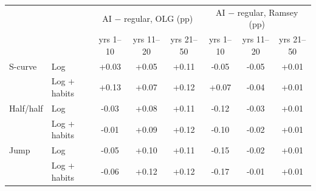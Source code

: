\begin{tabular}{llcccccc}\toprule
 & & \multicolumn{3}{c}{AI $-$ regular, OLG (pp)} & \multicolumn{3}{c}{AI $-$ regular, Ramsey (pp)}\\
 & & yrs 1--10 & yrs 11--20 & yrs 21--50 & yrs 1--10 & yrs 11--20 & yrs 21--50\\\midrule
S-curve & Log & +0.03 & +0.05 & +0.11 & -0.05 & -0.05 & +0.01\\
 & Log + habits & +0.13 & +0.07 & +0.12 & +0.07 & -0.04 & +0.01\\
\midrule
Half/half & Log & -0.03 & +0.08 & +0.11 & -0.12 & -0.03 & +0.01\\
 & Log + habits & -0.01 & +0.09 & +0.12 & -0.10 & -0.02 & +0.01\\
\midrule
Jump & Log & -0.05 & +0.10 & +0.11 & -0.15 & -0.02 & +0.01\\
 & Log + habits & -0.06 & +0.12 & +0.12 & -0.17 & -0.01 & +0.01\\
\bottomrule\end{tabular}
